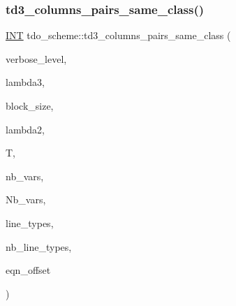 \subsubsection{\texorpdfstring{td3\+\_\+columns\+\_\+pairs\+\_\+same\+\_\+class()}{td3\_columns\_pairs\_same\_class()}}
{\footnotesize\ttfamily \mbox{\hyperlink{galois_8h_a09fddde158a3a20bd2dcadb609de11dc}{I\+NT}} tdo\+\_\+scheme\+::td3\+\_\+columns\+\_\+pairs\+\_\+same\+\_\+class (\begin{DoxyParamCaption}\item[{\mbox{\hyperlink{galois_8h_a09fddde158a3a20bd2dcadb609de11dc}{I\+NT}}}]{verbose\+\_\+level,  }\item[{\mbox{\hyperlink{galois_8h_a09fddde158a3a20bd2dcadb609de11dc}{I\+NT}}}]{lambda3,  }\item[{\mbox{\hyperlink{galois_8h_a09fddde158a3a20bd2dcadb609de11dc}{I\+NT}}}]{block\+\_\+size,  }\item[{\mbox{\hyperlink{galois_8h_a09fddde158a3a20bd2dcadb609de11dc}{I\+NT}}}]{lambda2,  }\item[{\mbox{\hyperlink{classtdo__data}{tdo\+\_\+data}} \&}]{T,  }\item[{\mbox{\hyperlink{galois_8h_a09fddde158a3a20bd2dcadb609de11dc}{I\+NT}}}]{nb\+\_\+vars,  }\item[{\mbox{\hyperlink{galois_8h_a09fddde158a3a20bd2dcadb609de11dc}{I\+NT}}}]{Nb\+\_\+vars,  }\item[{\mbox{\hyperlink{galois_8h_a09fddde158a3a20bd2dcadb609de11dc}{I\+NT}} $\ast$\&}]{line\+\_\+types,  }\item[{\mbox{\hyperlink{galois_8h_a09fddde158a3a20bd2dcadb609de11dc}{I\+NT}} \&}]{nb\+\_\+line\+\_\+types,  }\item[{\mbox{\hyperlink{galois_8h_a09fddde158a3a20bd2dcadb609de11dc}{I\+NT}}}]{eqn\+\_\+offset }\end{DoxyParamCaption})}

\mbox{\label{classtdo__scheme_a41a3bc5b830bd67109f16d8ab6ec0fb7}} 

